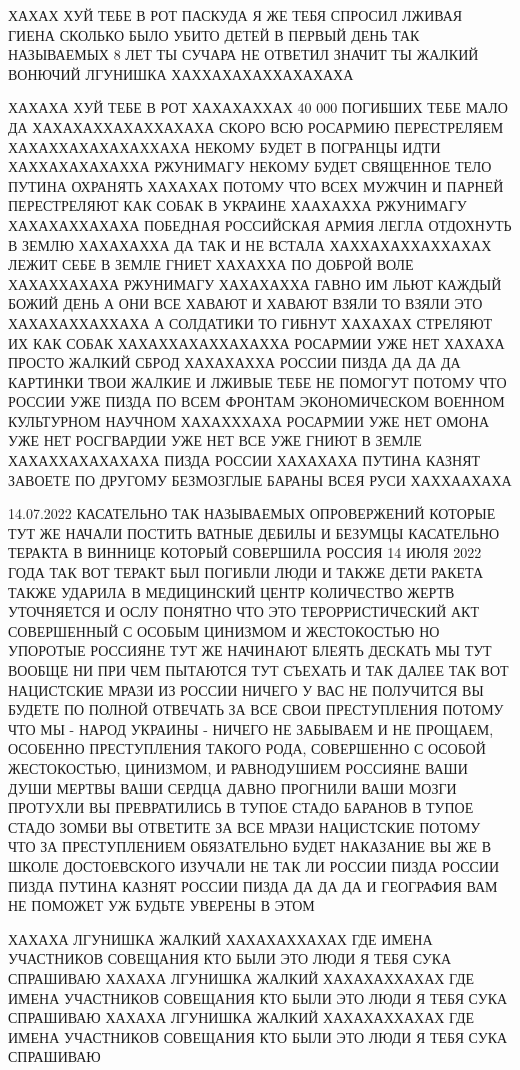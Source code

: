 ХАХАХ ХУЙ ТЕБЕ В РОТ ПАСКУДА Я ЖЕ ТЕБЯ СПРОСИЛ ЛЖИВАЯ ГИЕНА СКОЛЬКО БЫЛО УБИТО
ДЕТЕЙ В ПЕРВЫЙ ДЕНЬ ТАК НАЗЫВАЕМЫХ 8 ЛЕТ ТЫ СУЧАРА НЕ ОТВЕТИЛ ЗНАЧИТ ТЫ ЖАЛКИЙ
ВОНЮЧИЙ ЛГУНИШКА ХАХХАХАХАХХАХАХАХА

ХАХАХА ХУЙ ТЕБЕ В РОТ ХАХАХАХХАХ 40 000 ПОГИБШИХ ТЕБЕ МАЛО ДА
ХАХАХАХХАХАХХАХАХА СКОРО ВСЮ РОСАРМИЮ ПЕРЕСТРЕЛЯЕМ ХАХАХХАХАХАХАХХАХА НЕКОМУ
БУДЕТ В ПОГРАНЦЫ ИДТИ ХАХХАХАХАХАХХА РЖУНИМАГУ НЕКОМУ БУДЕТ СВЯЩЕННОЕ ТЕЛО ПУТИНА 
ОХРАНЯТЬ ХАХАХАХ ПОТОМУ ЧТО ВСЕХ МУЖЧИН И ПАРНЕЙ ПЕРЕСТРЕЛЯЮТ КАК СОБАК В УКРАИНЕ
ХААХАХХА РЖУНИМАГУ ХАХАХАХХАХАХА ПОБЕДНАЯ РОССИЙСКАЯ АРМИЯ ЛЕГЛА ОТДОХНУТЬ В ЗЕМЛЮ
ХАХАХАХХА ДА ТАК И НЕ ВСТАЛА ХАХХАХАХХАХХАХАХ ЛЕЖИТ СЕБЕ В ЗЕМЛЕ ГНИЕТ ХАХАХХА
ПО ДОБРОЙ ВОЛЕ ХАХАХХАХАХА РЖУНИМАГУ ХАХАХАХХА ГАВНО ИМ ЛЬЮТ КАЖДЫЙ БОЖИЙ ДЕНЬ
А ОНИ ВСЕ ХАВАЮТ И ХАВАЮТ ВЗЯЛИ ТО ВЗЯЛИ ЭТО ХАХАХАХХАХХАХА А СОЛДАТИКИ ТО ГИБНУТ ХАХАХАХ
СТРЕЛЯЮТ ИХ КАК СОБАК ХАХАХХАХАХХАХАХХА РОСАРМИИ УЖЕ НЕТ ХАХАХА ПРОСТО ЖАЛКИЙ СБРОД ХАХАХАХХА
РОССИИ ПИЗДА ДА ДА ДА КАРТИНКИ ТВОИ ЖАЛКИЕ И ЛЖИВЫЕ ТЕБЕ НЕ ПОМОГУТ ПОТОМУ ЧТО 
РОССИИ УЖЕ ПИЗДА ПО ВСЕМ ФРОНТАМ ЭКОНОМИЧЕСКОМ ВОЕННОМ КУЛЬТУРНОМ НАУЧНОМ ХАХАХХХАХА
РОСАРМИИ УЖЕ НЕТ ОМОНА УЖЕ НЕТ РОСГВАРДИИ УЖЕ НЕТ ВСЕ УЖЕ ГНИЮТ В ЗЕМЛЕ ХАХАХХАХАХАХАХА
ПИЗДА РОССИИ ХАХАХАХА ПУТИНА КАЗНЯТ ЗАВОЕТЕ ПО ДРУГОМУ БЕЗМОЗГЛЫЕ БАРАНЫ ВСЕЯ РУСИ ХАХХААХАХА

14.07.2022
КАСАТЕЛЬНО ТАК НАЗЫВАЕМЫХ ОПРОВЕРЖЕНИЙ КОТОРЫЕ ТУТ ЖЕ НАЧАЛИ ПОСТИТЬ ВАТНЫЕ
ДЕБИЛЫ И БЕЗУМЦЫ КАСАТЕЛЬНО ТЕРАКТА В ВИННИЦЕ КОТОРЫЙ СОВЕРШИЛА РОССИЯ 14 ИЮЛЯ
2022 ГОДА ТАК ВОТ ТЕРАКТ БЫЛ ПОГИБЛИ ЛЮДИ И ТАКЖЕ ДЕТИ РАКЕТА ТАКЖЕ УДАРИЛА В
МЕДИЦИНСКИЙ ЦЕНТР КОЛИЧЕСТВО ЖЕРТВ УТОЧНЯЕТСЯ И ОСЛУ ПОНЯТНО ЧТО ЭТО
ТЕРОРРИСТИЧЕСКИЙ АКТ СОВЕРШЕННЫЙ С ОСОБЫМ ЦИНИЗМОМ И ЖЕСТОКОСТЬЮ НО УПОРОТЫЕ
РОССИЯНЕ ТУТ ЖЕ НАЧИНАЮТ БЛЕЯТЬ ДЕСКАТЬ МЫ ТУТ ВООБЩЕ НИ ПРИ ЧЕМ ПЫТАЮТСЯ ТУТ
СЪЕХАТЬ И ТАК ДАЛЕЕ ТАК ВОТ НАЦИСТСКИЕ МРАЗИ ИЗ РОССИИ НИЧЕГО У ВАС НЕ
ПОЛУЧИТСЯ ВЫ БУДЕТЕ ПО ПОЛНОЙ ОТВЕЧАТЬ ЗА ВСЕ СВОИ ПРЕСТУПЛЕНИЯ ПОТОМУ ЧТО МЫ -
НАРОД УКРАИНЫ - НИЧЕГО НЕ ЗАБЫВАЕМ И НЕ ПРОЩАЕМ, ОСОБЕННО ПРЕСТУПЛЕНИЯ ТАКОГО
РОДА, СОВЕРШЕННО С ОСОБОЙ ЖЕСТОКОСТЬЮ, ЦИНИЗМОМ, И РАВНОДУШИЕМ РОССИЯНЕ ВАШИ
ДУШИ МЕРТВЫ ВАШИ СЕРДЦА ДАВНО ПРОГНИЛИ ВАШИ МОЗГИ ПРОТУХЛИ ВЫ ПРЕВРАТИЛИСЬ В
ТУПОЕ СТАДО БАРАНОВ В ТУПОЕ СТАДО ЗОМБИ ВЫ ОТВЕТИТЕ ЗА ВСЕ МРАЗИ НАЦИСТСКИЕ
ПОТОМУ ЧТО ЗА ПРЕСТУПЛЕНИЕМ ОБЯЗАТЕЛЬНО БУДЕТ НАКАЗАНИЕ ВЫ ЖЕ В ШКОЛЕ
ДОСТОЕВСКОГО ИЗУЧАЛИ НЕ ТАК ЛИ РОССИИ ПИЗДА РОССИИ ПИЗДА ПУТИНА КАЗНЯТ РОССИИ
ПИЗДА ДА ДА ДА И ГЕОГРАФИЯ ВАМ НЕ ПОМОЖЕТ УЖ БУДЬТЕ УВЕРЕНЫ В ЭТОМ

ХАХАХА ЛГУНИШКА ЖАЛКИЙ ХАХАХАХХАХАХ ГДЕ ИМЕНА УЧАСТНИКОВ СОВЕЩАНИЯ КТО БЫЛИ ЭТО
ЛЮДИ Я ТЕБЯ СУКА СПРАШИВАЮ
ХАХАХА ЛГУНИШКА ЖАЛКИЙ ХАХАХАХХАХАХ ГДЕ ИМЕНА УЧАСТНИКОВ СОВЕЩАНИЯ КТО БЫЛИ ЭТО
ЛЮДИ Я ТЕБЯ СУКА СПРАШИВАЮ
ХАХАХА ЛГУНИШКА ЖАЛКИЙ ХАХАХАХХАХАХ ГДЕ ИМЕНА УЧАСТНИКОВ СОВЕЩАНИЯ КТО БЫЛИ ЭТО
ЛЮДИ Я ТЕБЯ СУКА СПРАШИВАЮ

